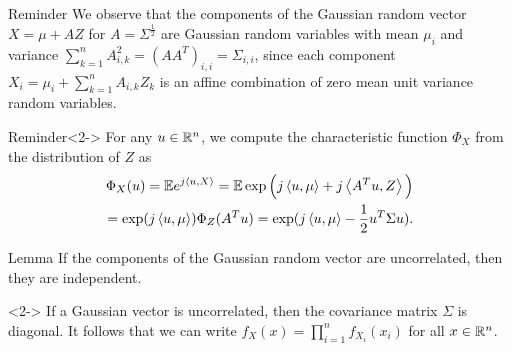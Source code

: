 \documentclass[12pt,aspectratio=169]{beamer}
\begin{document}
\begin{frame}
\begin{block}{Reminder}
We observe that the components of the Gaussian random vector $X = \mu + A Z$ for $A = \Sigma^{\frac{1}{2}}$ are Gaussian random variables with mean $\mu_i$ and variance $\sum_{k=1}^nA_{i,k}^2 = (AA^T)_{i,i} = \Sigma_{i,i}$, 
since each component $X_i = \mu_i + \sum_{k=1}^nA_{i,k}Z_k$ is an affine combination of zero mean unit variance \iid random variables. 
\end{block}
\begin{block}{Reminder}<2->
For any $u \in \mathbb{R}^n$, 
we compute the characteristic function $\Phi_X$ from the distribution of $Z$ as 
\begin{align*}
    \Phi_X(u) 
    = \mathbb{E} e^{j\left\langle u,X\right\rangle} 
    = \mathbb{E}\exp\Big(j\left\langle u,\mu\right\rangle + j\left\langle A^Tu,Z\right\rangle\Big) \\
    = \exp(j\left\langle u,\mu\right\rangle)\Phi_Z(A^Tu) 
    = \exp(j\left\langle u,\mu\right\rangle-\frac{1}{2}u^T\Sigma u).
\end{align*}
\end{block}
\end{frame}

\begin{frame}
\begin{block}{Lemma} 
If the components of the Gaussian random vector are uncorrelated, 
then they are independent. 
\end{block} 
\begin{Proof}<2->
If a Gaussian vector is uncorrelated, then the covariance matrix $\Sigma$ is diagonal. 
It follows that we can write $f_X(x) = \prod_{i=1}^nf_{X_i}(x_i)$ for all $x\in\mathbb{R}^n$.  
\end{Proof}
\end{frame}
\end{document}
